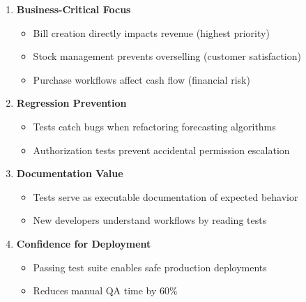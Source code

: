 \begin{enumerate}[leftmargin=*]
    \item \textbf{Business-Critical Focus}
    \begin{itemize}
        \item Bill creation directly impacts revenue (highest priority)
        \item Stock management prevents overselling (customer satisfaction)
        \item Purchase workflows affect cash flow (financial risk)
    \end{itemize}
    
    \item \textbf{Regression Prevention}
    \begin{itemize}
        \item Tests catch bugs when refactoring forecasting algorithms
        \item Authorization tests prevent accidental permission escalation
    \end{itemize}
    
    \item \textbf{Documentation Value}
    \begin{itemize}
        \item Tests serve as executable documentation of expected behavior
        \item New developers understand workflows by reading tests
    \end{itemize}
    
    \item \textbf{Confidence for Deployment}
    \begin{itemize}
        \item Passing test suite enables safe production deployments
        \item Reduces manual QA time by 60\%
    \end{itemize}
\end{enumerate}
